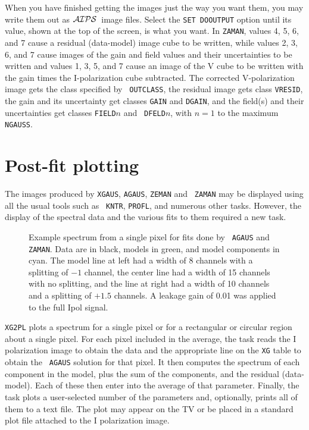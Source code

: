 \documentclass[twoside]{article}
\newcommand{\AIPS}{{$\cal AIPS\/$}}
\newcommand{\putfig}[1]{\texttt{[image: \#1.eps]}}
\begin{document}
When you have finished getting the images just the way you want them,
you may write them out as \AIPS\ image files.  Select the {\tt SET
  DOOUTPUT} option until its value, shown at the top of the screen, is
what you want.  In {\tt ZAMAN}, values 4, 5, 6, and 7 cause a residual
(data-model) image cube to be written, while values 2, 3, 6, and 7
cause images of the gain and field values and their uncertainties to
be written and values 1, 3, 5, and 7 cause an image of the V cube to
be written with the gain times the I-polarization cube subtracted.
The corrected V-polarization image gets the class specified by {\tt
  OUTCLASS}, the residual image gets class {\tt VRESID}, the gain and
its uncertainty get classes {\tt GAIN} and {\tt DGAIN}, and the
field(s) and their uncertainties get classes {\tt FIELD}$n$ and {\tt
  DFELD}$n$, with $n = 1$ to the maximum {\tt NGAUSS}\@.

\section{Post-fit plotting}

The images produced by {\tt XGAUS}, {\tt AGAUS}, {\tt ZEMAN} and {\tt
  ZAMAN} may be displayed using all the usual tools such as {\tt
  KNTR}, {\tt PROFL}, and numerous other tasks.  However, the display
of the spectral data and the various fits to them required a new task.

\begin{figure}
\begin{center}
\resizebox{6.0in}{!}{\putfig{XG2PL.agaus}}
\caption{Example spectrum from a single pixel for fits done by {\tt
    AGAUS} and {\tt ZAMAN}.  Data are in black, models in green, and
  model components in cyan.  The model line at left had a width of 8
  channels with a splitting of $-1$ channel, the center line had a
  width of 15 channels with no splitting, and the line at right had a
  width of 10 channels and a splitting of $+1.5$ channels.  A leakage
  gain of 0.01 was applied to the full Ipol signal.}
\label{fig:XG2PL.agaus}
\end{center}
\end{figure}

{\tt XG2PL} plots a spectrum for a single pixel or for a rectangular
or circular region about a single pixel.  For each pixel included in
the average, the task reads the I polarization image to obtain the
data and the appropriate line on the {\tt XG} table to obtain the {\tt
  AGAUS} solution for that pixel.  It then computes the spectrum of
each component in the model, plus the sum of the components, and the
residual (data-model).  Each of these then enter into the average of
that parameter.  Finally, the task plots a user-selected number of the
parameters and, optionally, prints all of them to a text file.  The
plot may appear on the TV or be placed in a standard plot file
attached to the I polarization image.
\end{document}
